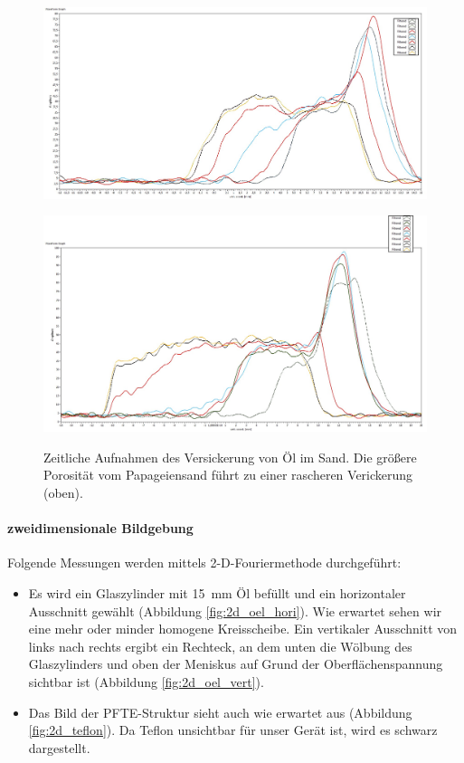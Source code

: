 \documentclass[a4paper]{scrartcl} %
\begin{document}
\begin{figure}[htbp]
	{
		\centering
		\includegraphics[width=.8 \linewidth]{./Resources/Teil_3/oeldiff_chinchilla.jpg}
		\label{fig:oeldiff_chinchilla}
	\vspace{1cm}
	
		\centering
		\includegraphics[width=.8 \linewidth]{./Resources/Teil_3/oeldiff_papa.jpg}
		\label{fig:oeldiff_papa}
	}	
		\caption{Zeitliche Aufnahmen des Versickerung von Öl im Sand. Die größere Porosität vom Papageiensand führt zu einer rascheren Verickerung (oben).}
		\label{fig:oel_diff}
	
\end{figure}

\paragraph{zweidimensionale Bildgebung}

Folgende Messungen werden mittels 2-D-Fouriermethode durchgeführt:

\begin{itemize}
	\item Es wird ein Glaszylinder mit \SI{15}{mm} Öl befüllt und ein horizontaler Ausschnitt gewählt (Abbildung \ref{fig:2d_oel_hori}). Wie erwartet sehen wir eine mehr oder minder homogene Kreisscheibe. Ein vertikaler Ausschnitt von links nach rechts ergibt ein Rechteck, an dem unten die Wölbung des Glaszylinders und oben der Meniskus auf Grund der Oberflächenspannung sichtbar ist (Abbildung \ref{fig:2d_oel_vert}).
	\item Das Bild der PFTE-Struktur sieht auch wie erwartet aus (Abbildung \ref{fig:2d_teflon}). Da Teflon unsichtbar für unser Gerät ist, wird es schwarz dargestellt.
\end{itemize}
\end{document}

